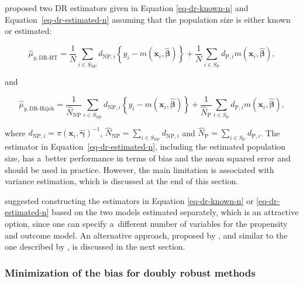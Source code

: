 \documentclass[
]{jss}
\begin{document}
\citet{chen2020doubly} proposed two DR estimators given in Equation
\ref{eq-dr-known-n} and Equation~\ref{eq-dr-estimated-n} assuming that
the population size is either known or estimated:

\begin{equation}
\hat{\mu}_{y,\text{DR-HT}}=\frac{1}{N} \sum_{i \in S_{\text{NP}}} d_{\text{NP},i}\left\{y_i-m\left(\boldsymbol{x}_i, \hat{\boldsymbol{\beta}}\right)\right\}+\frac{1}{N} \sum_{i \in S_{\text{P}}} d_{\text{P},i} m\left(\boldsymbol{x}_i, \hat{\boldsymbol{\beta}}\right),
\label{eq-dr-known-n}
\end{equation}

and

\begin{equation}
\hat{\mu}_{y,\text{DR-H\'{a}jek}}=\frac{1}{\hat{N}_{\text{NP}}} \sum_{i \in S_{\text{NP}}} d_{\text{NP},i}\left\{y_i-m\left(\boldsymbol{x}_i, \hat{\boldsymbol{\beta}}\right)\right\}+\frac{1}{\hat{N}_{\text{P}}} \sum_{i \in S_{\text{P}}} d_{\text{P},i} m\left(\boldsymbol{x}_i, \hat{\boldsymbol{\beta}}\right),
\label{eq-dr-estimated-n}
\end{equation}

where
\(d_{\text{NP},i}=\pi\left(\boldsymbol{x}_i, \hat{\boldsymbol{\gamma}}\right)^{-1}\),
\(\hat{N}_{\text{NP}}=\sum_{i \in S_{\text{NP}}} d_{\text{NP},i}\) and
\(\hat{N}_{\text{P}}=\sum_{i \in S_{\text{P}}} d_{\text{P},i}\). The
estimator in Equation~\ref{eq-dr-estimated-n}, including the estimated
population size, has a~better performance in terms of bias and the mean
squared error and should be used in practice. However, the main
limitation is associated with variance estimation, which is discussed at
the end of this section.

\citet{chen2020doubly} suggested constructing the estimators in Equation
\ref{eq-dr-known-n} or \ref{eq-dr-estimated-n} based on the two models
estimated separately, which is an attractive option, since one can
specify a~different number of variables for the propensity and outcome
model. An alternative approach, proposed by \citet{yang_doubly_2020},
and similar to the one described by \citet{kim2014doubly}, is discussed
in the next section.

\subsubsection{Minimization of the bias for doubly robust
methods}\label{minimization-of-the-bias-for-doubly-robust-methods}
\end{document}
